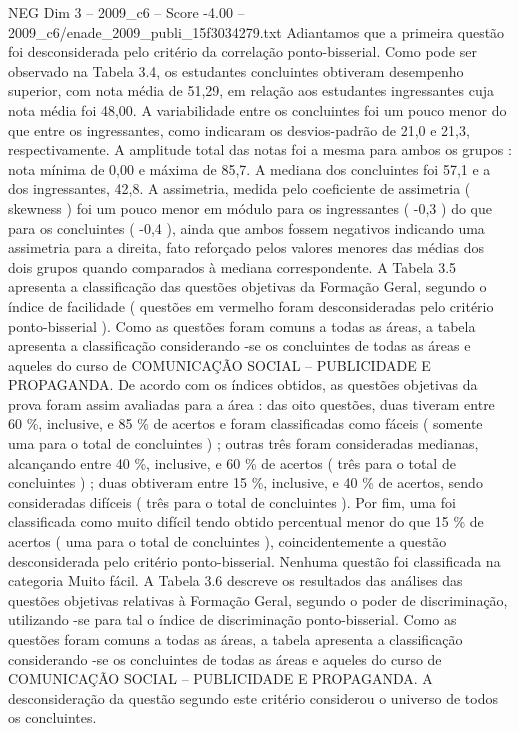 \begin{textsample}{NEG Dim 3 – 2009\_c6 – Score -4.00 – 2009\_c6/enade\_2009\_publi\_15f3034279.txt}
Adiantamos que a primeira questão foi desconsiderada pelo critério da correlação ponto-bisserial.
Como pode ser observado na Tabela 3.4, os estudantes concluintes obtiveram desempenho superior, com nota média de 51,29, em relação aos estudantes ingressantes cuja nota média foi 48,00.
A variabilidade entre os concluintes foi um pouco menor do que entre os ingressantes, como indicaram os desvios-padrão de 21,0 e 21,3, respectivamente.
A amplitude total das notas foi a mesma para ambos os grupos : nota mínima de 0,00 e máxima de 85,7.
A mediana dos concluintes foi 57,1 e a dos ingressantes, 42,8.
A assimetria, medida pelo coeficiente de assimetria ( skewness ) foi um pouco menor em módulo para os ingressantes ( -0,3 ) do que para os concluintes ( -0,4 ), ainda que ambos fossem negativos indicando uma assimetria para a direita, fato reforçado pelos valores menores das médias dos dois grupos quando comparados à mediana correspondente.
A Tabela 3.5 apresenta a classificação das questões objetivas da Formação Geral, segundo o índice de facilidade ( questões em vermelho foram desconsideradas pelo critério ponto-bisserial ).
Como as questões foram comuns a todas as áreas, a tabela apresenta a classificação considerando -se os concluintes de todas as áreas e aqueles do curso de COMUNICAÇÃO SOCIAL – PUBLICIDADE E PROPAGANDA.
De acordo com os índices obtidos, as questões objetivas da prova foram assim avaliadas para a área : das oito questões, duas tiveram entre 60 \%, inclusive, e 85 \% de acertos e foram classificadas como fáceis ( somente uma para o total de concluintes ) ; outras três foram consideradas medianas, alcançando entre 40 \%, inclusive, e 60 \% de acertos ( três para o total de concluintes ) ; duas obtiveram entre 15 \%, inclusive, e 40 \% de acertos, sendo consideradas difíceis ( três para o total de concluintes ).
Por fim, uma foi classificada como muito difícil tendo obtido percentual menor do que 15 \% de acertos ( uma para o total de concluintes ), coincidentemente a questão desconsiderada pelo critério ponto-bisserial.
Nenhuma questão foi classificada na categoria Muito fácil.
A Tabela 3.6 descreve os resultados das análises das questões objetivas relativas à Formação Geral, segundo o poder de discriminação, utilizando -se para tal o índice de discriminação ponto-bisserial.
Como as questões foram comuns a todas as áreas, a tabela apresenta a classificação considerando -se os concluintes de todas as áreas e aqueles do curso de COMUNICAÇÃO SOCIAL – PUBLICIDADE E PROPAGANDA.
A desconsideração da questão segundo este critério considerou o universo de todos os concluintes.

\end{textsample}
